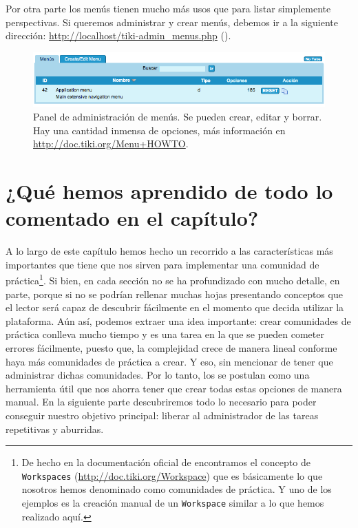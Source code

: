 Por otra parte los menús tienen mucho más usos que para listar simplemente perspectivas. Si queremos administrar y crear menús, debemos ir a la siguiente dirección: \url{http://localhost/tiki-admin_menus.php} ().

\begin{figure}
\includegraphics[width=\linewidth]{../graphics/fig_admin_menus.png}
\caption{Panel de administración de menús. Se pueden crear, editar y borrar. Hay una cantidad inmensa de opciones, más información en \url{http://doc.tiki.org/Menu+HOWTO}.}\label{fig:admin_menus}
\end{figure}

\section{¿Qué hemos aprendido de todo lo comentado en el capítulo?}

A lo largo de este capítulo hemos hecho un recorrido a las características más importantes que tiene \tiki{} que nos sirven para implementar una comunidad de práctica\footnote{De hecho en la documentación oficial de \tiki{} encontramos el concepto de \texttt{Workspaces} (\url{http://doc.tiki.org/Workspace}) que es básicamente lo que nosotros hemos denominado como comunidades de práctica. Y uno de los ejemplos es la creación manual de un \texttt{Workspace} similar a lo que hemos realizado aquí.}. Si bien, en cada sección no se ha profundizado con mucho detalle, en parte, porque si no se podrían rellenar muchas hojas presentando conceptos que el lector será capaz de descubrir fácilmente en el momento que decida utilizar la plataforma. Aún así, podemos extraer una idea importante: crear comunidades de práctica conlleva mucho tiempo y es una tarea en la que se pueden cometer errores fácilmente, puesto que, la complejidad crece de manera lineal conforme haya más comunidades de práctica a crear. Y eso, sin mencionar de tener que administrar dichas comunidades. Por lo tanto, los \profiles{} se postulan como una herramienta útil que nos ahorra tener que crear todas estas opciones de manera manual. En la siguiente parte descubriremos todo lo necesario para poder conseguir nuestro objetivo principal: liberar al administrador de las tareas repetitivas y aburridas.
